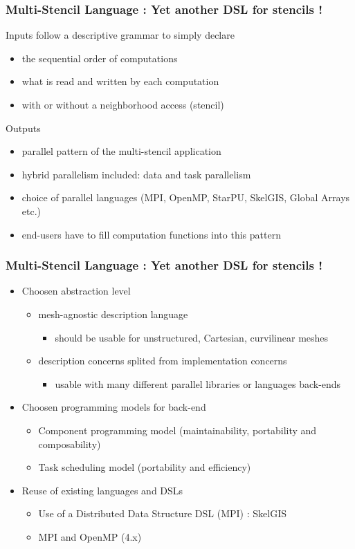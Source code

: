 \documentclass{beamer}
\begin{document}
\begin{frame}
\frametitle{Multi-Stencil Language : Yet another DSL for stencils !}
\begin{block}{Inputs}
follow a descriptive grammar to simply declare
\begin{itemize}
\item the sequential order of computations
\item what is read and written by each computation
\item with or without a neighborhood access (stencil)
\end{itemize}
\end{block}
\begin{block}{Outputs}
\begin{itemize}
\item parallel pattern of the multi-stencil application
\item hybrid parallelism included: data and task parallelism
\item choice of parallel languages (MPI, OpenMP, StarPU, SkelGIS, Global Arrays etc.)
\item end-users have to fill computation functions into this pattern
\end{itemize}
\end{block}
\end{frame}
\begin{frame}
\frametitle{Multi-Stencil Language : Yet another DSL for stencils !}
\begin{itemize}
\item Choosen abstraction level
\begin{itemize}
\item mesh-agnostic description language
\begin{itemize}
\item should be usable for unstructured, Cartesian, curvilinear meshes
\end{itemize}
\item description concerns splited from implementation concerns
\begin{itemize}
\item usable with many different parallel libraries or languages back-ends
\end{itemize}
\end{itemize}
\item Choosen programming models for back-end
\begin{itemize}
\item Component programming model (maintainability, portability and composability)
\item Task scheduling model (portability and efficiency)
\end{itemize}
\item Reuse of existing languages and DSLs
\begin{itemize}
\item Use of a Distributed Data Structure DSL (MPI) : SkelGIS
\item MPI and OpenMP (4.x)
\end{itemize}
\end{itemize}
\end{frame}
\end{document}
